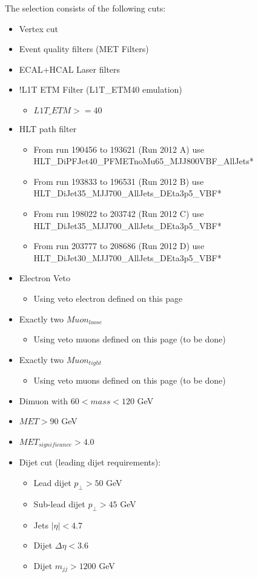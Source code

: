 The selection consists of the following cuts:
\begin{itemize}
  \item Vertex cut
  \item Event quality filters (MET Filters)
  \item ECAL+HCAL Laser filters
  \item !L1T ETM Filter (L1T\_ETM40 emulation)
  \begin{itemize}
    \item $ L1T\_ETM >= 40 $
  \end{itemize}
  \item HLT path filter
  \begin{itemize}
    \item From run 190456 to 193621 (Run 2012 A) use HLT\_DiPFJet40\_PFMETnoMu65\_MJJ800VBF\_AllJets* 
    \item From run 193833 to 196531 (Run 2012 B) use HLT\_DiJet35\_MJJ700\_AllJets\_DEta3p5\_VBF*
    \item From run 198022 to 203742 (Run 2012 C) use HLT\_DiJet35\_MJJ700\_AllJets\_DEta3p5\_VBF*
    \item From run 203777 to 208686 (Run 2012 D) use HLT\_DiJet30\_MJJ700\_AllJets\_DEta3p5\_VBF*
  \end{itemize}
  \item Electron Veto
  \begin{itemize}
    \item Using veto electron defined on this page
  \end{itemize}
  \item Exactly two $Muon_{loose}$
  \begin{itemize}
    \item Using veto muons defined on this page (to be done)
  \end{itemize}
  \item Exactly two $Muon_{tight}$
  \begin{itemize}
    \item Using veto muons defined on this page (to be done)
  \end{itemize}
  \item Dimuon with $60<mass<120$ GeV
  \item $ MET > 90 $ GeV
  \item $ MET_{significance} > 4.0 $
  \item Dijet cut (leading dijet requirements):
  \begin{itemize}
    \item Lead dijet $ p_{\perp} > 50$ GeV
    \item Sub-lead dijet $ p_{\perp} > 45$ GeV
    \item Jets $ |\eta| < 4.7 $
    \item Dijet $ \Delta\eta < 3.6 $
    \item Dijet $ m_{jj} > 1200 $ GeV
  \end{itemize}
\end{itemize}
  
